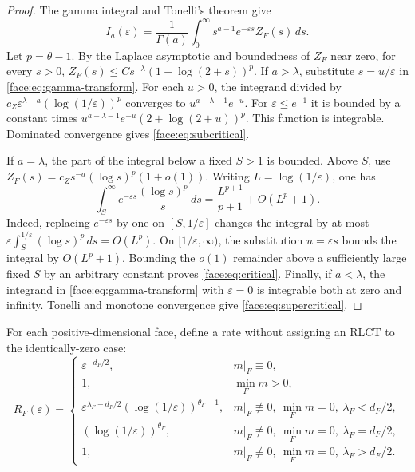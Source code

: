 \begin{proof}
The gamma integral and Tonelli's theorem give
\begin{equation}
 \label{face:eq:gamma-transform}
 I_a(\varepsilon)=\frac1{\Gamma(a)}
 \int_0^\infty s^{a-1}e^{-\varepsilon s}Z_F(s)\,ds.
\end{equation}
Let $p=\theta-1$.  By the Laplace asymptotic and boundedness of $Z_F$
near zero, for every $s>0$,
$Z_F(s)\le C s^{-\lambda}(1+\log(2+s))^p$.
If $a>\lambda$, substitute $s=u/\varepsilon$ in
\eqref{face:eq:gamma-transform}.  For each $u>0$, the integrand divided
by $c_Z\varepsilon^{\lambda-a}(\log(1/\varepsilon))^p$
converges to $u^{a-\lambda-1}e^{-u}$.  For
$\varepsilon\le e^{-1}$ it is bounded by a constant times
$u^{a-\lambda-1}e^{-u}(2+\log(2+u))^p$.
This function is integrable.  Dominated convergence gives
\eqref{face:eq:subcritical}.

If $a=\lambda$, the part of the integral below a fixed $S>1$ is
bounded.  Above $S$, use
$Z_F(s)=c_Zs^{-a}(\log s)^p(1+o(1))$.  Writing
$L=\log(1/\varepsilon)$, one has
\[
 \int_S^\infty e^{-\varepsilon s}\frac{(\log s)^p}{s}\,ds
 =\frac{L^{p+1}}{p+1}+O(L^p+1).
\]
Indeed, replacing $e^{-\varepsilon s}$ by one on $[S,1/\varepsilon]$
changes the integral by at most
$\varepsilon\int_S^{1/\varepsilon}(\log s)^p\,ds=O(L^p)$.
On $[1/\varepsilon,\infty)$, the substitution
$u=\varepsilon s$ bounds the integral by $O(L^p+1)$.
Bounding the $o(1)$ remainder above a sufficiently large fixed $S$
by an arbitrary constant proves \eqref{face:eq:critical}.
Finally, if $a<\lambda$, the integrand in
\eqref{face:eq:gamma-transform} with $\varepsilon=0$ is integrable
both at zero and infinity.  Tonelli and monotone convergence give
\eqref{face:eq:supercritical}.
\end{proof}

For each positive-dimensional face, define a rate without assigning
an RLCT to the identically-zero case:
\begin{equation}
 \label{face:eq:face-rate}
 R_F(\varepsilon)=
 \begin{cases}
  \varepsilon^{-d_F/2},&m|_F\equiv0,\\
  1,&\min_Fm>0,\\
  \varepsilon^{\lambda_F-d_F/2}
   (\log(1/\varepsilon))^{\theta_F-1},
    &m|_F\not\equiv0,\ \min_Fm=0,\ \lambda_F<d_F/2,\\
  (\log(1/\varepsilon))^{\theta_F},
    &m|_F\not\equiv0,\ \min_Fm=0,\ \lambda_F=d_F/2,\\
  1,&m|_F\not\equiv0,\ \min_Fm=0,\ \lambda_F>d_F/2.
 \end{cases}
\end{equation}

